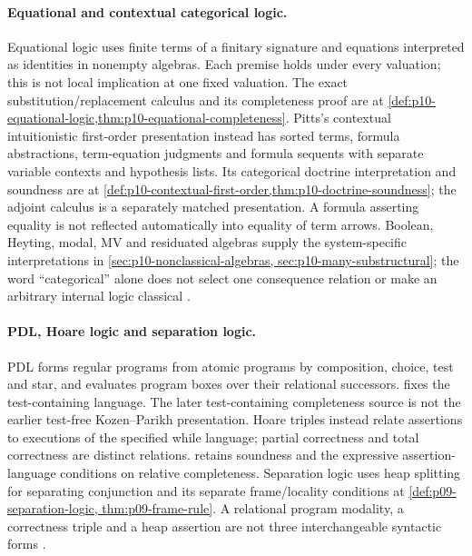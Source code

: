 \paragraph{Equational and contextual categorical logic.}
\label{entry:p14-directory-algebraic-categorical}
Equational logic uses finite terms of a finitary signature and equations
interpreted as identities in nonempty algebras. Each premise holds under
every valuation; this is not local implication at one fixed valuation.
The exact substitution/replacement calculus and its completeness proof are
at \cref{def:p10-equational-logic,thm:p10-equational-completeness}.
Pitts's contextual intuitionistic first-order presentation instead has
sorted terms, formula abstractions, term-equation judgments and formula
sequents with separate variable contexts and hypothesis lists.
Its categorical doctrine interpretation and soundness are at
\cref{def:p10-contextual-first-order,thm:p10-doctrine-soundness}; the
adjoint calculus is a separately matched presentation. A formula asserting
equality is not reflected automatically into equality of term arrows.
Boolean, Heyting, modal, MV and residuated algebras supply the
system-specific interpretations in \cref{sec:p10-nonclassical-algebras,
sec:p10-many-substructural}; the word ``categorical'' alone does not select
one consequence relation or make an arbitrary internal logic classical
\cite{BurrisSankappanavar2012,Pitts1995Draft,LambekScott1986}.

\paragraph{PDL, Hoare logic and separation logic.}
\label{entry:p14-directory-program}
PDL forms regular programs from atomic programs by composition, choice,
test and star, and evaluates program boxes over their relational successors.
 fixes the test-containing language.
The later test-containing completeness source is not the earlier
test-free Kozen--Parikh presentation. Hoare triples instead relate
assertions to executions of the specified while language; partial
correctness and total correctness are distinct relations.
 retains soundness and the expressive
assertion-language conditions on relative completeness. Separation
logic uses heap splitting for separating conjunction and its separate
frame/locality conditions at \cref{def:p09-separation-logic,
thm:p09-frame-rule}. A relational program modality, a correctness triple
and a heap assertion are not three interchangeable syntactic forms
\cite{HarelKozenTiuryn2000,KozenParikh1981,Hoare1969,Cook1978,
OHearnReynoldsYang2001}.

